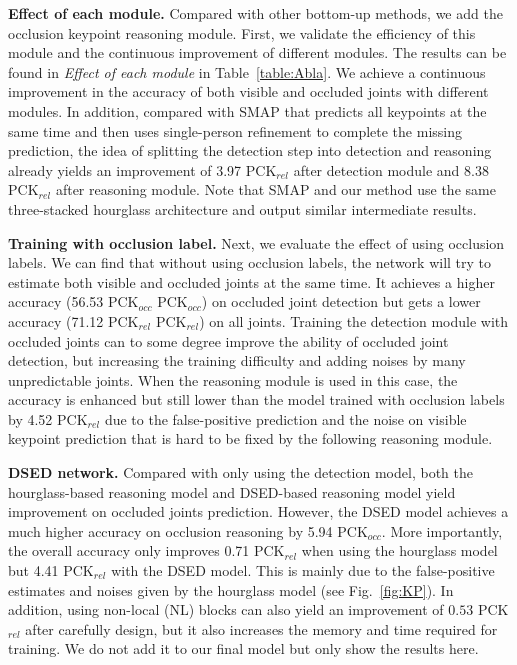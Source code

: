 \noindent\textbf{Effect of each module.}
Compared with other bottom-up methods, we add the occlusion keypoint reasoning module. First, we validate the efficiency of this module and the continuous improvement of different modules. The results can be found in \textit{Effect of each module} in Table~\ref{table:Abla}.  We achieve a continuous improvement in the accuracy of both visible and occluded joints with different modules. In addition, compared with SMAP that predicts all keypoints at the same time and then uses single-person refinement to complete the missing prediction, the idea of splitting the detection step into detection and reasoning already yields an improvement of 3.97 PCK$_{rel}$ after detection module and 8.38 PCK$_{rel}$ after reasoning module. Note that SMAP and our method use the same three-stacked hourglass architecture and output similar intermediate results.

\noindent\textbf{Training with occlusion label.} 
Next, we evaluate the effect of using occlusion labels. We can find that without using occlusion labels, the network will try to estimate both visible and occluded joints at the same time. It achieves a higher accuracy (56.53 PCK$_{occ}$  PCK$_{occ}$) on occluded joint detection but gets a lower accuracy (71.12 PCK$_{rel}$  PCK$_{rel}$) on all joints.  Training the detection module with occluded joints can to some degree improve the ability of occluded joint detection, but increasing the training difficulty and adding noises by many unpredictable joints. When the reasoning module is used in this case, the accuracy is enhanced but still lower than the model trained with occlusion labels by 4.52 PCK$_{rel}$ due to the false-positive prediction and the noise on visible keypoint prediction that is hard to be fixed by the following reasoning module.

\noindent\textbf{DSED network.}
Compared with only using the detection model, both the hourglass-based reasoning model and DSED-based reasoning model yield improvement on occluded joints prediction. However, the DSED model achieves a much higher accuracy on occlusion reasoning by 5.94 PCK$_{occ}$. More importantly, the overall accuracy only improves 0.71 PCK$_{rel}$ when using the hourglass model but 4.41 PCK$_{rel}$ with the DSED model. This is mainly due to the false-positive estimates and noises given by the hourglass model (see Fig.~\ref{fig:KP}). 
In addition, using non-local (NL) blocks can also yield an improvement of $0.53$ PCK$_{rel}$ after carefully design, but it also increases the memory and time required for training. We do not add it to our final model but only show the results here.

